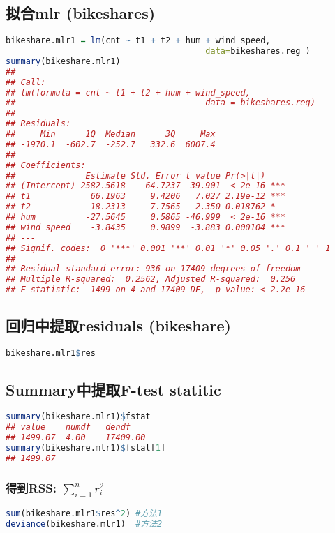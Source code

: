 \documentclass[11pt,a4paper]{article}
\begin{document}
\subsection{拟合mlr (bikeshares)}
\begin{lstlisting}[language=R]
bikeshare.mlr1 = lm(cnt ~ t1 + t2 + hum + wind_speed,
                                        data=bikeshares.reg )
summary(bikeshare.mlr1)
## 
## Call:
## lm(formula = cnt ~ t1 + t2 + hum + wind_speed,
##                                      data = bikeshares.reg)
## 
## Residuals:
##     Min      1Q  Median      3Q     Max 
## -1970.1  -602.7  -252.7   332.6  6007.4 
## 
## Coefficients:
##              Estimate Std. Error t value Pr(>|t|)    
## (Intercept) 2582.5618    64.7237  39.901  < 2e-16 ***
## t1            66.1963     9.4206   7.027 2.19e-12 ***
## t2           -18.2313     7.7565  -2.350 0.018762 *  
## hum          -27.5645     0.5865 -46.999  < 2e-16 ***
## wind_speed    -3.8435     0.9899  -3.883 0.000104 ***
## ---
## Signif. codes:  0 '***' 0.001 '**' 0.01 '*' 0.05 '.' 0.1 ' ' 1
## 
## Residual standard error: 936 on 17409 degrees of freedom
## Multiple R-squared:  0.2562, Adjusted R-squared:  0.256 
## F-statistic:  1499 on 4 and 17409 DF,  p-value: < 2.2e-16
\end{lstlisting}

\subsection{回归中提取residuals (bikeshare)}
\begin{lstlisting}[language=R]
bikeshare.mlr1$res
\end{lstlisting}
\subsection{Summary中提取F-test statitic}
\begin{lstlisting}[language=R]
summary(bikeshare.mlr1)$fstat
## value    numdf   dendf
## 1499.07  4.00    17409.00
summary(bikeshare.mlr1)$fstat[1]
## 1499.07
\end{lstlisting}
\subsubsection{得到RSS: $\sum_{i=1}^nr_i^2$}
\begin{lstlisting}[language=R]
sum(bikeshare.mlr1$res^2) #方法1
deviance(bikeshare.mlr1)  #方法2
\end{lstlisting}
\end{document}
